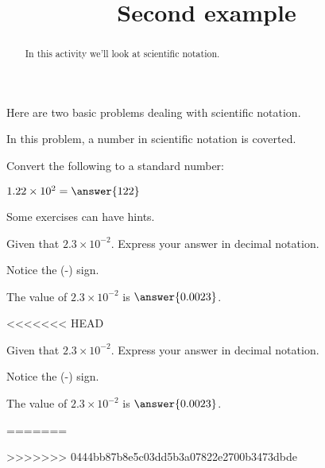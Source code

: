 \documentclass{ximera}
\title{Second example}
\begin{document}
\begin{abstract}
In this activity we'll look at scientific notation.
\end{abstract}
\maketitle




Here are two basic problems dealing with scientific notation. 

\begin{example}
In this problem, a number in scientific notation is coverted.
\end{example}


Convert the following to a standard number:

\begin{exercise}
$1.22\times 10^2=\answer{122}$
\end{exercise}

Some exercises can have hints.

\begin{exercise}
Given that $2.3\times 10^{-2}$. Express your answer in decimal notation.
%
\begin{hint}
Notice the (-) sign.
\end{hint}


The value of $2.3\times 10^{-2}$ is $\answer{0.0023}$.
%
\end{exercise}

<<<<<<< HEAD
\begin{exercise}
Given that $2.3\times 10^{-2}$. Express your answer in decimal notation.
%
\begin{hint}
Notice the (-) sign.
\end{hint}

The value of $2.3\times 10^{-2}$ is $\answer{0.0023}$.
%
\end{exercise}
=======



>>>>>>> 0444bb87b8e5c03dd5b3a07822e2700b3473dbde
\end{document}
